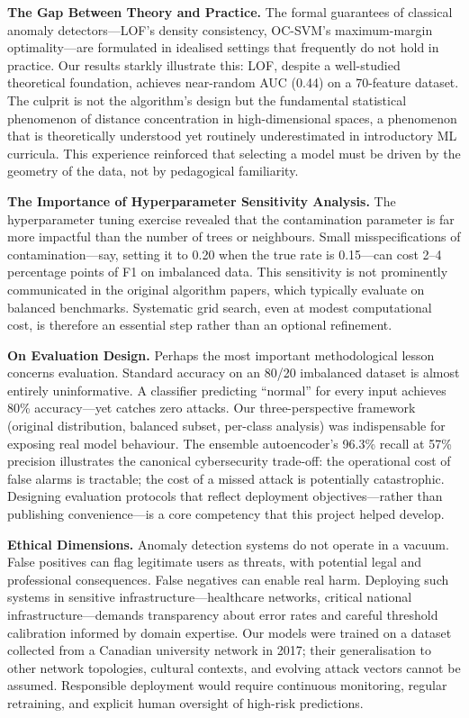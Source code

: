 \textbf{The Gap Between Theory and Practice.}
The formal guarantees of classical anomaly detectors—LOF's density consistency, OC-SVM's maximum-margin optimality—are formulated in idealised settings that frequently do not hold in practice. Our results starkly illustrate this: LOF, despite a well-studied theoretical foundation, achieves near-random AUC (0.44) on a 70-feature dataset. The culprit is not the algorithm's design but the fundamental statistical phenomenon of distance concentration in high-dimensional spaces, a phenomenon that is theoretically understood \cite{zimek2012survey} yet routinely underestimated in introductory ML curricula. This experience reinforced that selecting a model must be driven by the geometry of the data, not by pedagogical familiarity.

\textbf{The Importance of Hyperparameter Sensitivity Analysis.}
The hyperparameter tuning exercise revealed that the contamination parameter is far more impactful than the number of trees or neighbours. Small misspecifications of contamination—say, setting it to 0.20 when the true rate is 0.15—can cost 2–4 percentage points of F1 on imbalanced data. This sensitivity is not prominently communicated in the original algorithm papers, which typically evaluate on balanced benchmarks. Systematic grid search, even at modest computational cost, is therefore an essential step rather than an optional refinement.

\textbf{On Evaluation Design.}
Perhaps the most important methodological lesson concerns evaluation. Standard accuracy on an 80/20 imbalanced dataset is almost entirely uninformative. A classifier predicting ``normal'' for every input achieves 80\% accuracy—yet catches zero attacks. Our three-perspective framework (original distribution, balanced subset, per-class analysis) was indispensable for exposing real model behaviour. The ensemble autoencoder's 96.3\% recall at 57\% precision illustrates the canonical cybersecurity trade-off: the operational cost of false alarms is tractable; the cost of a missed attack is potentially catastrophic. Designing evaluation protocols that reflect deployment objectives—rather than publishing convenience—is a core competency that this project helped develop.

\textbf{Ethical Dimensions.}
Anomaly detection systems do not operate in a vacuum. False positives can flag legitimate users as threats, with potential legal and professional consequences. False negatives can enable real harm. Deploying such systems in sensitive infrastructure—healthcare networks, critical national infrastructure—demands transparency about error rates and careful threshold calibration informed by domain expertise. Our models were trained on a dataset collected from a Canadian university network in 2017; their generalisation to other network topologies, cultural contexts, and evolving attack vectors cannot be assumed. Responsible deployment would require continuous monitoring, regular retraining, and explicit human oversight of high-risk predictions.

